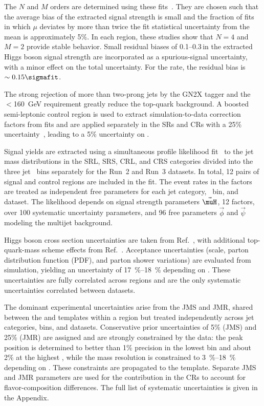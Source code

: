 \documentclass[PAPER, cernpreprint=true, atlasdraft=false, UKenglish, texmf, orcidlogo]{atlasdoc}
\begin{document}
The $N$ and $M$ orders are determined using these fits~\cite{HIGG-2021-08}.
They are chosen such that the average bias of the extracted signal strength is small and the fraction of fits in which $\mu$ deviates by more than twice the fit statistical uncertainty \sigmafit from the mean is approximately 5\%. In each region, these studies show that $N=4$ and $M=2$ provide stable behavior.
Small residual biases of 0.1--0.3\,\sigmafit in the extracted Higgs boson signal strength are incorporated as a spurious-signal uncertainty, with a minor effect on the total uncertainty.
For the \Zbb rate, the residual bias is $\sim0.15\sigmafit$.

The strong rejection of more than two-prong jets by the GN2X tagger and the \mJ$<$160~GeV requirement greatly reduce the top-quark background.
A boosted semi-leptonic \ttbar control region is used to extract simulation-to-data correction factors from \mJ fits and are applied separately in the SRs and CRs with a 25\% uncertainty~\cite{TOPQ-2022-24}, leading to a 5\% uncertainty on \muH.





Signal yields are extracted using a simultaneous profile likelihood fit~\cite{RooFit,Gligorov2021Avoiding}
to the jet mass distributions in the SRL, SRS, CRL, and CRS categories divided into the three jet \pT\ bins separately for the Run~2 and Run~3 datasets. In total, 12 pairs of signal and control regions are included in the fit.
The \Zbb event rates in the \KGNTX factors are treated as independent free parameters for each jet category, \pT\ bin, and dataset.
The likelihood depends on \Hbb signal strength parameters $\vec{\muH}$, 12 \KGNTX factors, over 100 systematic uncertainty parameters, and 96 free parameters $\vec{\phi}$ and $\vec{\psi}$ modeling the multijet background.

Higgs boson cross section uncertainties are taken from Ref.~\cite{Becker:2020rjp}, with additional top-quark-mass scheme effects from Ref.~\cite{ATL-PHYS-PUB-2023-031}. Acceptance uncertainties (scale, parton distribution function (PDF), and parton shower variations) are evaluated from simulation, yielding an uncertainty of \SIrange{17}{18}{\%} depending on \pT. These uncertainties are fully correlated across regions and are the only systematic uncertainties correlated between datasets.

The dominant experimental uncertainties arise from the JMS and JMR, shared between the \Zbb and \Hbb templates within a region but treated independently across jet categories, \pT bins, and datasets. Conservative prior uncertainties of 5\% (JMS) and 25\% (JMR) are assigned and are strongly constrained by the data: the \Zbb peak position is determined to better than 1\% precision in the lowest \pT bin and about 2\% at the highest \pT, while the mass resolution is constrained to \SIrange{3}{18}{\%} depending on \pT. These constraints are propagated to the \Hbb template. Separate JMS and JMR parameters are used for the \Vqq contribution in the CRs to account for flavor-composition differences. The full list of systematic uncertainties is given in the Appendix.
\end{document}
